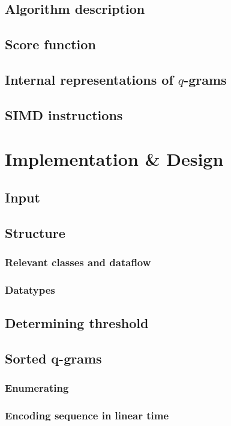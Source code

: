 \documentclass[11pt,a4paper]{scrartcl}
\begin{document}
\subsection{Algorithm description}

\subsection{Score function}

\subsection{Internal representations of $q$-grams}

\subsection{SIMD instructions}
\section{Implementation \& Design}
\subsection{Input}

\subsection{Structure}
\subsubsection{Relevant classes and dataflow}

\subsubsection{Datatypes}

\subsection{Determining threshold}

\subsection{Sorted q-grams}

\subsubsection{Enumerating}
\subsubsection{Encoding sequence in linear time}
\end{document}

